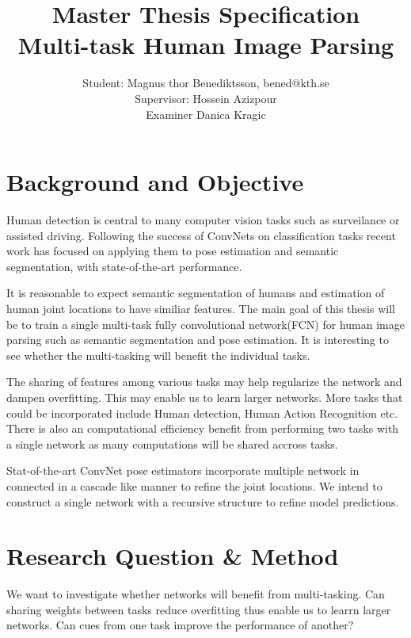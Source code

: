 \documentclass[a4paper,10pt]{article}
\title{Master Thesis Specification \\ Multi-task Human Image Parsing }
\author{Student: Magnus thor Benediktsson, bened@kth.se \\ Supervisor: Hossein Azizpour \\ Examiner Danica Kragic}
\begin{document}
\maketitle



\section{Background and Objective}

Human detection is central to many computer vision tasks such as surveilance or assisted driving.  Following the success of ConvNets on classification tasks recent work has focused on applying them to pose estimation\cite{Tompson2015}\cite{Wei2016} and semantic segmentation\cite{Long2014},\cite{Noh2015} with state-of-the-art performance.

It is reasonable to expect semantic segmentation of humans and estimation of human joint locations to have similiar features.  The main goal of this thesis will be to train a single multi-task fully convolutional network(FCN)\cite{Long2014}\cite{references in long} for human image parsing such as semantic segmentation and pose estimation. It is interesting to see whether the multi-tasking will benefit the individual tasks.

The sharing of features among various tasks may help regularize the network and dampen overfitting.  This may enable us to learn larger networks.  More tasks that could be incorporated include Human detection, Human Action Recognition etc. There is also an computational efficiency benefit from performing two tasks with a single network as many computations will be shared accross tasks.

Stat-of-the-art ConvNet pose estimators incorporate multiple network in connected in a cascade like manner to refine the joint locations\cite{Tompson2015}\cite{Wei2016}.  We intend to construct a single network with a recursive structure to refine model predictions.



\section{Research Question \& Method}
We want to investigate whether networks will benefit from multi-tasking.  Can sharing weights between tasks reduce overfitting thus enable us to learrn larger networks.  Can cues from one task improve the performance of another? 
\end{document}
